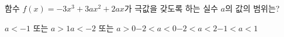 함수 $f(x)=-3x^3+3ax^2+2ax$가 극값을 갖도록 하는 실수 $a$의 값의 범위는?
\begin{choicesii}{$a<-1$ 또는 $a>1$}{$a<-2$ 또는 $a>0$}{$-2<a<0$}{$-2<a<2$}{$-1<a<1$}\end{choicesii}
